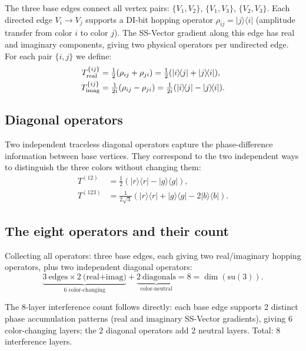 \documentclass[11pt,a4paper]{article}
\newcommand{\ket}[1]{|#1\rangle}
\newcommand{\bra}[1]{\langle#1|}
\begin{document}
The three base edges connect all vertex pairs:
$\{V_1, V_2\}$, $\{V_1, V_3\}$, $\{V_2, V_3\}$.
Each directed edge $V_i \to V_j$ supports a DI-bit hopping operator
$\rho_{ij} = \ket{j}\!\bra{i}$ (amplitude transfer from color $i$
to color $j$).  The SS-Vector gradient along this edge has real and
imaginary components, giving two physical operators per undirected
edge.  For each pair $\{i, j\}$ we define:
\begin{align}
T^{\{ij\}}_{\rm real} &= \tfrac{1}{2}(\rho_{ij} + \rho_{ji})
= \tfrac{1}{2}(\ket{i}\!\bra{j} + \ket{j}\!\bra{i}),
\label{eq:Treal} \\
T^{\{ij\}}_{\rm imag} &= \tfrac{1}{2i}(\rho_{ij} - \rho_{ji})
= \tfrac{1}{2i}(\ket{i}\!\bra{j} - \ket{j}\!\bra{i}).
\label{eq:Timag}
\end{align}

\subsection{Diagonal operators}

Two independent traceless diagonal operators capture the
phase-difference information between base vertices.  They
correspond to the two independent ways to distinguish
the three colors without changing them:
\begin{align}
T^{(12)} &= \tfrac{1}{2}(\ket{r}\!\bra{r} - \ket{g}\!\bra{g}),
\label{eq:T3def} \\
T^{(123)} &= \frac{1}{2\sqrt{3}}
(\ket{r}\!\bra{r} + \ket{g}\!\bra{g} - 2\ket{b}\!\bra{b}).
\label{eq:T8def}
\end{align}

\subsection{The eight operators and their count}

Collecting all operators: three base edges, each giving two
real/imaginary hopping operators, plus two independent diagonal
operators:
\begin{equation}
\underbrace{3\ \text{edges} \times 2\ \text{(real+imag)}}_{\text{6
color-changing}} + \underbrace{2\ \text{diagonals}}_{\text{color-neutral}}
= 8 = \dim(\mathrm{su}(3)).
\label{eq:count}
\end{equation}

The 8-layer interference count follows directly: each base edge
supports 2 distinct phase accumulation patterns (real and imaginary
SS-Vector gradients), giving 6 color-changing layers; the 2
diagonal operators add 2 neutral layers.  Total: 8 interference
layers.
\end{document}
